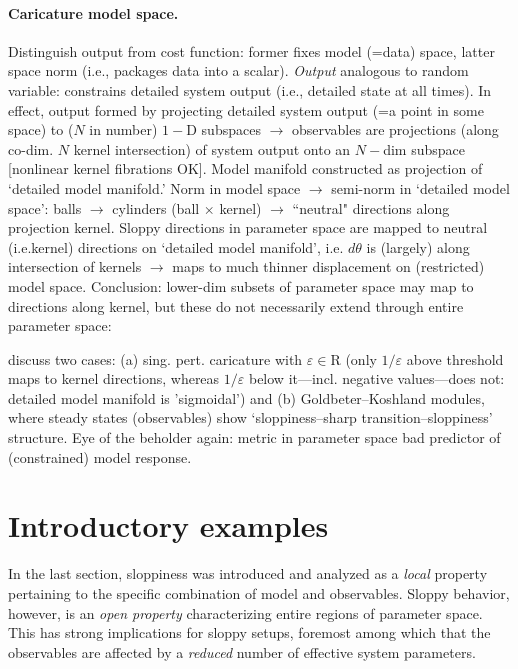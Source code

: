\documentclass{article}
\newcommand{\eps}{\varepsilon}
\newcommand{\R}{\mathrm{R}}
\begin{document}
{\color{gray}\paragraph{Caricature model space.}
Distinguish output from cost function: former fixes model (=data)
space, latter space norm (i.e., packages data into a scalar).
\emph{Output} analogous to random variable: constrains detailed system
output (i.e., detailed state at all times).  In effect, output formed
by projecting detailed system output (=a point in some space) to ($N$
in number) $1-$D subspaces $\rightarrow$ observables are projections
(along co-dim. $N$ kernel intersection) of system output onto an
$N-$dim subspace [nonlinear kernel fibrations OK].  Model manifold
constructed as projection of `detailed model manifold.'  Norm in model
space $\rightarrow$ semi-norm in `detailed model space': balls
$\rightarrow$ cylinders (ball $\times$ kernel) $\rightarrow$
``neutral" directions along projection kernel.  Sloppy directions in
parameter space are mapped to neutral (i.e.kernel) directions on
`detailed model manifold', i.e. $d\theta$ is (largely) along
intersection of kernels $\rightarrow$ maps to much thinner
displacement on (restricted) model space.  Conclusion: lower-dim
subsets of parameter space may map to directions along kernel, but
these do not necessarily extend through entire parameter space:}
discuss two cases: (a) sing. pert. caricature with $\eps\in\R$ (only
$1/\eps$ above threshold maps to kernel directions, whereas $1/\eps$
below it---incl. negative values---does not: detailed model manifold
is 'sigmoidal') and (b) Goldbeter--Koshland modules, where steady
states (observables) show `sloppiness--sharp transition--sloppiness'
structure.  {\color{gray}Eye of the beholder again: metric in parameter space bad
predictor of (constrained) model response.}



\section{Introductory examples}
%
In the last section, sloppiness was introduced and analyzed as a \emph{local} property pertaining to the specific combination of model and observables.
Sloppy behavior, however, is an \emph{open property} characterizing entire regions of parameter space.
This has strong implications for sloppy setups, foremost among which that the observables are affected by a \emph{reduced} number of effective system parameters.\\
\end{document}
